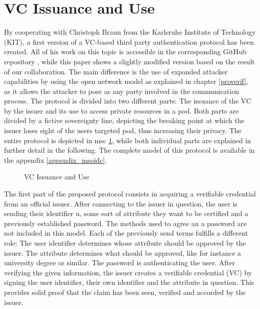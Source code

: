 \documentclass[11pt,twoside,a4paper,openright]{book}
\begin{document}

\section{VC Issuance and Use}

By cooperating with Christoph Braun from the Karlsruhe Institute of Technology (KIT), a first version of a VC-based third party authentication protocol has been created. All of his work on this topic is accessible in the corresponding GitHub repository \cite{githubChristoph}, while this paper shows a slightly modified version based on the result of our collaboration. The main difference is the use of expanded attacker capabilities by using the open network model as explained in chapter \ref{proverif}, as it allows the attacker to pose as any party involved in the communication process. The protocol is divided into two different parts: The issuance of the VC by the issuer and its use to access private resources in a pod. Both parts are divided by a fictive sovereignty line, depicting the breaking point at which the issuer loses sight of the users targeted pod, thus increasing their privacy. The entire protocol is depicted in msc \ref{fig:msc_msoidc_small}, while both individual parts are explained in further detail in the following. The complete model of this protocol is available in the appendix \ref{appendix_msoidc}.

\begin{figure}[H]
    \centering
    
    \caption{VC Issuance and Use}
    \label{fig:msc_msoidc_small}
\end{figure}

The first part of the proposed protocol consists in acquiring a verifiable credential from an official issuer. After connecting to the issuer in question, the user is sending their identifier u, some sort of attribute they want to be certified and a previously established password. The methods used to agree an a password are not included in this model. Each of the previously send terms fulfills a different role: The user identifier determines whose attribute should be approved by the issuer. The attribute determines what should be approved, like for instance a university degree or similar. The password is authenticating the user. After verifying the given information, the issuer creates a verifiable credential (VC) by signing the user identifier, their own identifier and the attribute in question. This provides solid proof that the claim has been seen, verified and accorded by the issuer.
\end{document}
